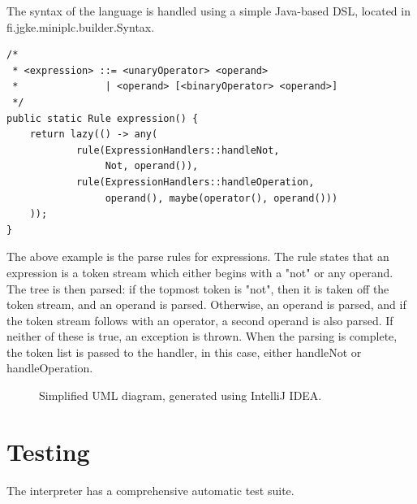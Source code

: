 \documentclass{article}
\begin{document}
\newpage

The syntax of the language is handled using a simple Java-based DSL, located in
fi.jgke.miniplc.builder.Syntax.

\begin{verbatim}
/*
 * <expression> ::= <unaryOperator> <operand>
 *               | <operand> [<binaryOperator> <operand>]
 */
public static Rule expression() {
    return lazy(() -> any(
            rule(ExpressionHandlers::handleNot,
                 Not, operand()),
            rule(ExpressionHandlers::handleOperation,
                 operand(), maybe(operator(), operand()))
    ));
}
\end{verbatim}

The above example is the parse rules for expressions. The rule states that an
expression is a token stream which either begins with a "not" or any operand.
The tree is then parsed: if the topmost token is "not", then it is taken off
the token stream, and an operand is parsed. Otherwise, an operand is parsed,
and if the token stream follows with an operator, a second operand is also
parsed. If neither of these is true, an exception is thrown. When the parsing
is complete, the token list is passed to the handler, in this case, either
handleNot or handleOperation.

\FloatBarrier
\begin{figure}[ht!]
    \begin{center}
    \end{center}
    \caption{Simplified UML diagram, generated using IntelliJ IDEA.}
    \label{fig:uml}
\end{figure}
\FloatBarrier

\section{Testing}
The interpreter has a comprehensive automatic test suite.
\newpage
\end{document}
